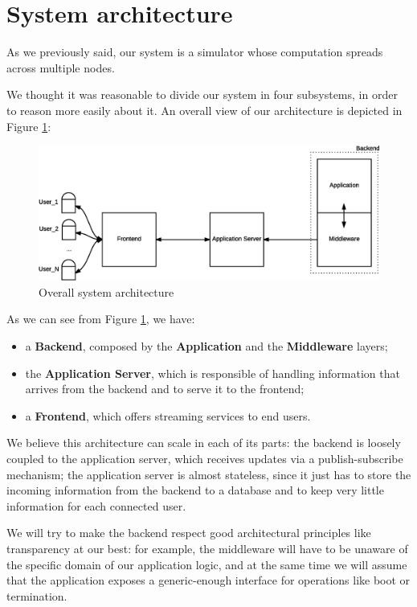 \section{System architecture}
As we previously said, our system is a simulator whose computation spreads
across multiple nodes.

We thought it was reasonable to divide our system in four subsystems, in order
to reason more easily about it. An overall view of our architecture is depicted
in Figure \ref{fig:sd-sys-arch-overall}:

\begin{figure}[H]
  \centering
  \includegraphics[scale=0.5,keepaspectratio]
    {images/solution/overall-arch.eps}
  \caption{Overall system architecture}
  \label{fig:sd-sys-arch-overall}
\end{figure}

As we can see from Figure \ref{fig:sd-sys-arch-overall}, we have:

\begin{itemize}
  \item a \textbf{Backend}, composed by the \textbf{Application} and the
    \textbf{Middleware} layers;
  \item the \textbf{Application Server}, which is responsible of handling
    information that arrives from the backend and to serve it to the frontend;
  \item a \textbf{Frontend}, which offers streaming services to end users.
\end{itemize}

We believe this architecture can scale in each of its parts: the backend is
loosely coupled to the application server, which receives updates via a
publish-subscribe mechanism; the application server is almost stateless, since
it just has to store the incoming information from the backend to a database
and to keep very little information for each connected user.

We will try to make the backend respect good architectural principles like
transparency at our best: for example, the middleware will have to be unaware
of the specific domain of our application logic, and at the same time we will
assume that the application exposes a generic-enough interface for operations
like boot or termination.

